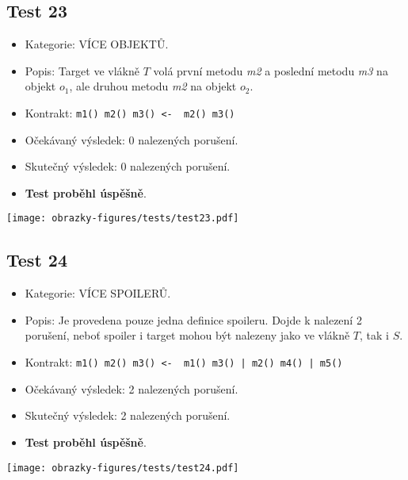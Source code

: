 \subsection*{Test 23}
\begin{itemize}
\item Kategorie: VÍCE OBJEKTŮ.
\item Popis: Target ve vlákně $T$ volá první metodu \textit{m2} a poslední metodu \textit{m3} na objekt $o_1$, ale druhou metodu \textit{m2} na objekt $o_2$.
\item Kontrakt: \texttt{m1() m2() m3() <- { m2() m3()}}
\item Očekávaný výsledek: 0 nalezených porušení.

\item Skutečný výsledek: 0 nalezených porušení.
\item \textbf{Test proběhl úspěšně}.
\end{itemize}
\begin{center}
    \centering
    \texttt{[image: obrazky-figures/tests/test23.pdf]}
    \label{test23}
\end{center}

\subsection*{Test 24}
\begin{itemize}
\item Kategorie: VÍCE SPOILERŮ.
\item Popis: Je provedena pouze jedna definice spoileru. Dojde k nalezení 2 porušení, neboť spoiler i target mohou být nalezeny jako ve vlákně $T$, tak i $S$. 
\item Kontrakt: \texttt{m1() m2() m3() <- { m1() m3() | m2() m4() | m5() }}
\item Očekávaný výsledek: 2 nalezených porušení.

\item Skutečný výsledek: 2 nalezených porušení.
\item \textbf{Test proběhl úspěšně}.
\end{itemize}
\begin{center}
    \centering
    \texttt{[image: obrazky-figures/tests/test24.pdf]}
    \label{test24}
\end{center}

